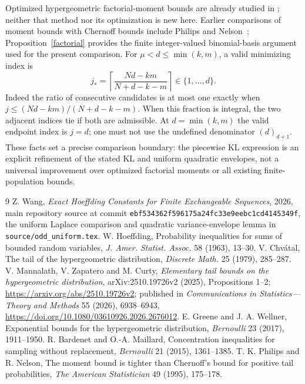 \documentclass[11pt]{article}
\begin{document}
Optimized hypergeometric factorial-moment bounds are already studied
in \cite{MZC}; neither that method nor its optimization is new here.
Earlier comparisons of moment bounds with Chernoff bounds include
Philips and Nelson~\cite{PN}; Proposition~\ref{factorial} provides the
finite integer-valued binomial-basis argument used for the present comparison.
For $\mu<d\le\min(k,m)$, a valid minimizing index is
\[
 j_* =\left\lceil\frac{Nd-km}{N+d-k-m}\right\rceil\in\{1,\ldots,d\}.
\]
Indeed the ratio of consecutive candidates is at most one exactly when
$j\le(Nd-km)/(N+d-k-m)$. When this fraction is integral, the two adjacent
indices tie if both are admissible. At $d=\min(k,m)$ the valid endpoint
index is $j=d$; one must not use the undefined denominator
$(d)_{\underline{d+1}}$. These facts set a precise comparison boundary:
the piecewise KL expression is an explicit refinement of the stated KL
and uniform quadratic envelopes, not a universal improvement over
optimized factorial moments or all existing finite-population bounds.

\begin{thebibliography}{9}
 Z. Wang, \emph{Exact Hoeffding Constants for Finite Exchangeable
Sequences}, 2026, main repository source at commit
\texttt{ebf534362f596175a24fc33e9eebc1cd4145349f},
the uniform Laplace comparison and quadratic variance-envelope lemma in
\texttt{source/odd\_uniform.tex}.
 W. Hoeffding, Probability inequalities for sums of bounded
random variables, \emph{J. Amer. Statist. Assoc.} 58 (1963), 13--30.
 V. Chv\'atal, The tail of the hypergeometric distribution,
\emph{Discrete Math.} 25 (1979), 285--287.
 V. Mannalath, V. Zapatero and M. Curty,
\emph{Elementary tail bounds on the hypergeometric distribution},
arXiv:2510.19726v2 (2025), Propositions 1--2;
\url{https://arxiv.org/abs/2510.19726v2}; published in
\emph{Communications in Statistics---Theory and Methods} 55 (2026),
6938--6943, \url{https://doi.org/10.1080/03610926.2026.2676012}.
 E. Greene and J. A. Wellner, Exponential bounds for the
hypergeometric distribution, \emph{Bernoulli} 23 (2017), 1911--1950.
 R. Bardenet and O.-A. Maillard, Concentration inequalities for
sampling without replacement, \emph{Bernoulli} 21 (2015), 1361--1385.
 T. K. Philips and R. Nelson, The moment bound is tighter than
Chernoff's bound for positive tail probabilities,
\emph{The American Statistician} 49 (1995), 175--178.
\end{thebibliography}
\end{document}
